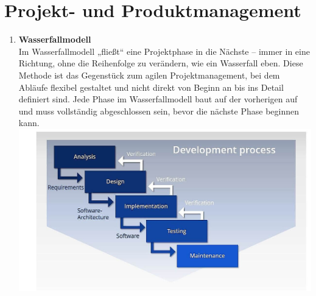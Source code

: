 \documentclass{article}
\begin{document}
\section*{Projekt- und Produktmanagement}
  \begin{enumerate}[label=\alph*)]
  
  \subsection*{Vorgehensmodelle}
  
  \item \textbf{Wasserfallmodell}\\
  Im Wasserfallmodell „fließt“ eine Projektphase in die Nächste – immer in eine Richtung, ohne die Reihenfolge zu verändern, wie ein Wasserfall eben. Diese Methode ist das Gegenstück zum agilen Projektmanagement, bei dem Abläufe flexibel gestaltet und nicht direkt von Beginn an bis ins Detail definiert sind. Jede Phase im Wasserfallmodell baut auf der vorherigen auf und muss vollständig abgeschlossen sein, bevor die nächste Phase beginnen kann.\\
  \includegraphics[scale=0.2]{media/Wasserfall.jpg}
  

\end{enumerate}
\end{document}
